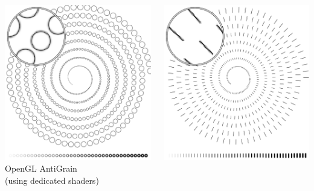 \documentclass[10pt]{beamer}
\begin{document}
\begin{frame}
\begin{block}{}
\begin{columns}
\begin{column}{.225\textwidth}
\begin{center}
        \includegraphics[width=\textwidth]{gl-circles-detail}\\
        \tiny OpenGL AntiGrain\\(using dedicated shaders)
        \end{center}
      \end{column}
      \begin{column}{.225\textwidth}
        \begin{center}
        \includegraphics[width=\textwidth]{agg-lines-detail}\\

\end{center}
\end{column}
\end{columns}
\end{block}
\end{frame}
\end{document}
